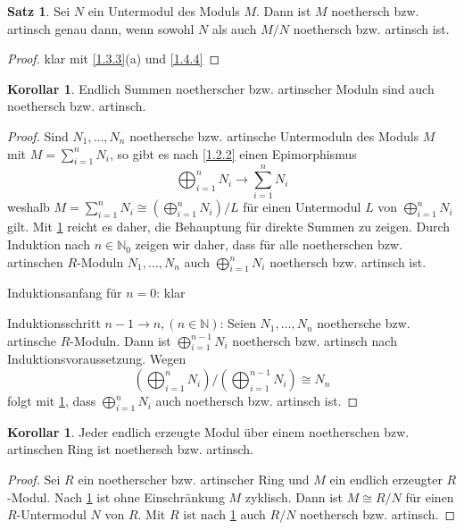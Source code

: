 \documentclass[
twoside=semi,
fontsize=12,
DIV=12, 
cleardoublepage=current,
leqno,
headings=optiontoheadandtoc, 
toc=idx
]{scrbook}
\newcommand{\N}{\mathbb{N}}
\newcommand{\brac}[1]{\left( #1 \right)}
\theoremstyle{definition}
\newtheorem{satz}[definition]{Satz}
\newtheorem{korollar}[definition]{Korollar}
\begin{document}
	\begin{satz}\label{1.4.5}
		Sei $N$ ein Untermodul des Moduls $M$. Dann ist $M$ noethersch bzw. artinsch genau dann, wenn sowohl $N$ als auch $M/N$ noethersch bzw. artinsch ist.
		
		\begin{proof}
			klar mit \ref{1.3.3}(a) und \ref{1.4.4}
		\end{proof}
	\end{satz}

	\begin{korollar}\label{1.4.6}
		Endlich Summen noetherscher bzw. artinscher Moduln sind auch noethersch bzw. artinsch.
		
		\begin{proof}
			Sind $N_1, \dots, N_n$ noethersche bzw. artinsche Untermoduln des Moduls $M$ mit $M = \sum_{i=1}^n N_i$, so gibt es nach \ref{1.2.2} einen Epimorphismus 
				\[\bigoplus_{i=1}^n N_i \to \sum_{i=1}^n N_i\]
			weshalb $M = \sum_{i=1}^nN_i \cong \brac{\bigoplus_{i=1}^n N_i} / L$ f\"ur einen Untermodul $L$ von $\bigoplus_{i=1}^nN_i$ gilt.\newline
			Mit \ref{1.4.5} reicht es daher, die Behauptung f\"ur direkte Summen zu zeigen.\newline
			Durch Induktion nach $n \in \N_0$ zeigen wir daher, dass f\"ur alle noetherschen bzw. artinschen $R$-Moduln $N_1, \dots, N_n$ auch $\bigoplus_{i=1}^n N_i$ noethersch bzw. artinsch ist.
			
			\noindent Induktionsanfang f\"ur $n = 0$: klar
			
			\noindent Induktionsschritt $n-1 \to n, (n \in \N)$: Seien $N_1, \dots, N_n$ noethersche bzw. artinsche $R$-Moduln. Dann ist $\bigoplus_{i=1}^{n-1} N_i$ noethersch bzw. artinsch nach Induktionsvoraussetzung. Wegen 
				\[\brac{\bigoplus_{i=1}^n N_i} / \brac{\bigoplus_{i=1}^{n-1} N_i} \cong N_n\]
			folgt mit \ref{1.4.5}, dass $\bigoplus_{i=1}^n N_i$ auch noethersch bzw. artinsch ist.
		\end{proof}
	\end{korollar}

	\begin{korollar}\label{1.4.7}
		Jeder endlich erzeugte Modul \"uber einem noetherschen bzw. artinschen Ring ist noethersch bzw. artinsch.
		
		\begin{proof}
			Sei $R$ ein noetherscher bzw. artinscher Ring und $M$ ein endlich erzeugter $R$-Modul. Nach \ref{1.4.6} ist ohne Einschr\"ankung $M$ zyklisch. Dann ist $M \cong R/N$ f\"ur einen $R$-Untermodul $N$ von $R$. Mit $R$ ist nach \ref{1.4.5} auch $R/N$ noethersch bzw. artinsch.
		\end{proof}
	\end{korollar}
\end{document}
